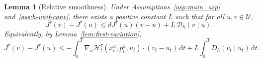 \documentclass[11pt]{amsart}
\theoremstyle{plain}
\newtheorem{lemma}{Lemma}
\theoremstyle{definition}
\theoremstyle{remark}
\newcommand{\dd}{\,\mathrm{d}}
\begin{document}
\begin{lemma}[Relative smoothness]\label{lem:relative-smoothness}
Under Assumptions~\ref{asp:main_asp} and~\ref{ass:h-unif-conv}, there exists a positive constant
$L$ such that for all $u,v\in\mathcal U$,
\begin{equation}\label{eq:relative-smoothness}
J^\tau(v)-J^\tau(u)
\le
dJ^\tau(u)(v-u)+L\,\mathcal{D}_h(v\mid u).
\end{equation}
Equivalently, by Lemma~\ref{lem:first-variation},
\begin{equation}\label{eq:relative-smoothness-H}
J^\tau(v)-J^\tau(u)
\le
-\int_0^T \nabla_u \mathcal H_t^\tau(x_t^u,p_t^u,u_t)\cdot (v_t-u_t)\dd t
+
L\int_0^T D_h(v_t\mid u_t)\dd t.
\end{equation}
\end{lemma}
\end{document}
